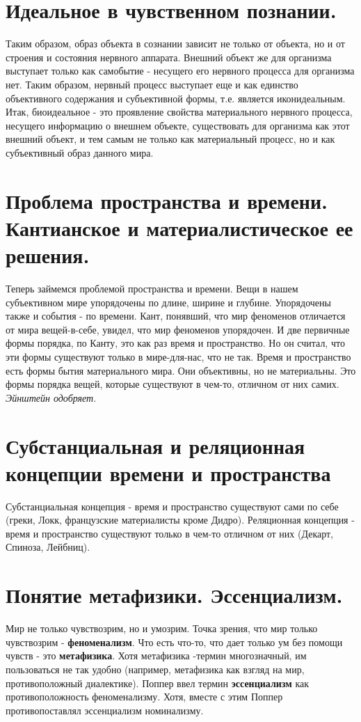 \section{ Идеальное в чувственном познании.}
Таким образом, образ объекта в сознании зависит не только от объекта, но и от строения и состояния нервного аппарата. Внешний объект же для организма выступает только как самобытие - несущего его нервного процесса для организма нет. Таким образом, нервный процесс выступает еще и как единство объективного содержания и субъективной формы, т.е. является иконидеальным. Итак, биоидеальное - это проявление свойства материального нервного процесса, несущего информацию о  внешнем объекте, существовать для организма как этот внешний объект, и тем самым не только как материальный процесс, но и как субъективный образ данного мира.

\section{ Проблема пространства и времени. Кантианское и материалистическое ее решения.}
Теперь займемся проблемой пространства и времени. Вещи в нашем субъективном мире упорядочены по длине, ширине и глубине. Упорядочены также и события - по времени. Кант, понявший, что мир феноменов отличается от мира вещей-в-себе, увидел, что мир феноменов упорядочен. И две первичные формы порядка, по Канту, это как раз время и пространство. Но он считал, что эти формы существуют только в мире-для-нас, что не так. Время и пространство есть формы бытия материального мира. Они объективны, но не материальны. Это формы порядка вещей, которые существуют в чем-то, отличном от них самих. \textit{Эйнштейн одобряет}.

\section{ Субстанциальная и реляционная концепции времени и пространства}
Субстанциальная концепция - время и пространство существуют сами по себе (греки, Локк, французские материалисты кроме Дидро). Реляционная концепция - время и пространство существуют только в чем-то отличном от них (Декарт, Спиноза, Лейбниц).

\section{ Понятие метафизики. Эссенциализм.}
Мир не только чувствозрим, но и умозрим. Точка зрения, что мир только чувствозрим - \textbf{феноменализм}. Что есть что-то, что дает только ум без помощи чувств - это \textbf{метафизика}. Хотя метафизика -термин многозначный, им пользоваться не так удобно (например, метафизика как взгляд на мир, противоположный диалектике). Поппер ввел термин \textbf{эссенциализм} как противоположность феноменализму. Хотя, вместе с этим Поппер противопоставлял эссенциализм номинализму.

